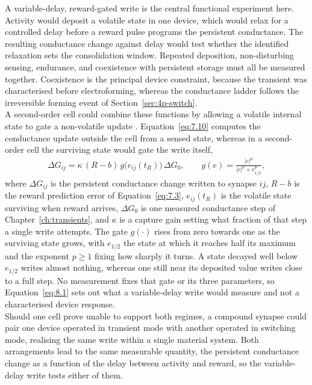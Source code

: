 \noindent A variable-delay, reward-gated write is the central functional experiment here. Activity would deposit a
volatile state in one device, which would relax for a controlled delay before a reward pulse programs the persistent
conductance. The resulting conductance change against delay would test whether the identified relaxation sets the
consolidation window. Repeated deposition, non-disturbing sensing, endurance, and coexistence with persistent storage
must all be measured together. Coexistence is the principal device constraint, because the transient was characterised
before electroforming, whereas the conductance ladder follows the irreversible forming event of
Section~\ref{sec:4p-switch}.\\

\noindent A second-order cell could combine these functions by allowing a volatile internal state to gate a
non-volatile update \cite{kim2015secondorder, chang2011shortterm, ohno2011shortterm, wang2017memristors}.
Equation~\ref{eq:7.10} computes the conductance update outside the cell from a sensed state, whereas in a second-order
cell the surviving state would gate the write itself,
\begin{align}
    \Delta G_{ij} = \kappa\,(R-b)\, g\!\big(e_{ij}(t_R)\big)\, \Delta G_0, \qquad
    g(e) = \frac{|e|^{p}}{|e|^{p} + e_{1/2}^{p}}, \label{eq:8.1}
\end{align}
where $\Delta G_{ij}$ is the persistent conductance change written to synapse $ij$, $R-b$ is the reward prediction error
of Equation~\ref{eq:7.3}, $e_{ij}(t_R)$ is the volatile state surviving when reward arrives, $\Delta G_0$ is one
measured conductance step of Chapter~\ref{ch:transients}, and $\kappa$ is a capture gain setting what fraction of that
step a single write attempts. The gate $g(\cdot)$ rises from zero towards one as the surviving state grows, with
$e_{1/2}$ the state at which it reaches half its maximum and the exponent $p \ge 1$ fixing how sharply it turns. A
state decayed well below $e_{1/2}$ writes almost nothing, whereas one still near its deposited value writes close to a
full step. No measurement fixes that gate or its three parameters, so Equation~\ref{eq:8.1} sets out what a
variable-delay write would measure and not a characterised device response.\\

\noindent Should one cell prove unable to support both regimes, a compound synapse could pair one  device
operated in transient mode with another operated in switching mode, realising the same write within a single material
system. Both arrangements lead to the same measurable quantity, the persistent conductance change as a function of the
delay between activity and reward, so the variable-delay write tests either of them.\\

